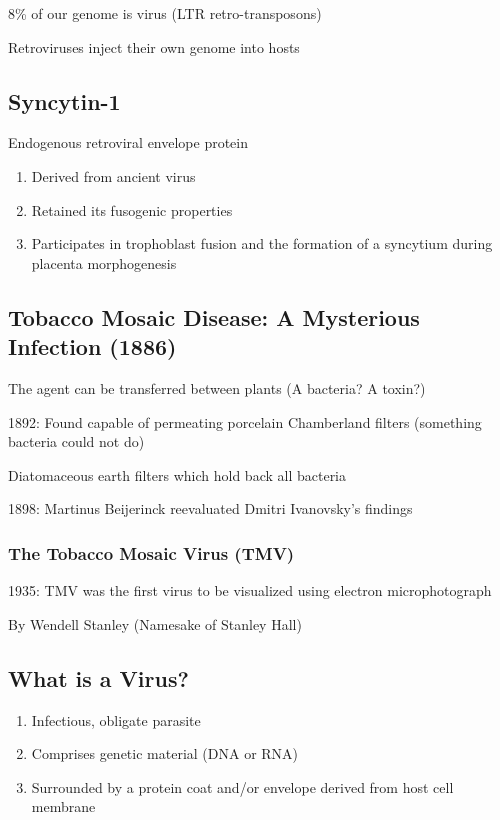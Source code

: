 \documentclass{notes}
\begin{document}
8\% of our genome is virus (LTR retro-transposons)

\tab \indicates Retroviruses inject their own genome into hosts

\subsection{Syncytin-1}

Endogenous retroviral envelope protein

\begin{enumerate}
    \item Derived from ancient virus
    \item Retained its fusogenic properties
    \item Participates in trophoblast fusion and the formation of a syncytium during placenta morphogenesis
\end{enumerate}


\subsection{Tobacco Mosaic Disease: A Mysterious Infection (1886)}

The agent can be transferred between plants (A bacteria? A toxin?)

1892: Found capable of permeating porcelain Chamberland filters (something bacteria could not do)

\tab \indicates Diatomaceous earth filters which hold back all bacteria

1898: Martinus Beijerinck reevaluated Dmitri Ivanovsky's findings

\subsubsection{The Tobacco Mosaic Virus (TMV)}

1935: TMV was the first virus to be visualized using electron microphotograph

\tab By Wendell Stanley (Namesake of Stanley Hall)

\subsection{What is a Virus?}

\begin{enumerate}
    \item Infectious, obligate parasite
    \item Comprises genetic material (DNA or RNA)
    \item Surrounded by a protein coat and/or envelope derived from host cell membrane
\end{enumerate}
\end{document}
